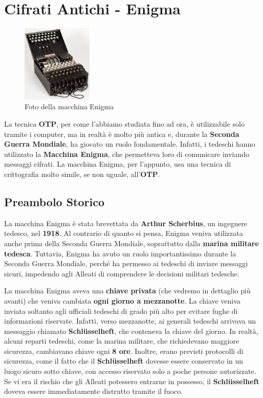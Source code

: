 \documentclass{rapport}
\begin{document}
\newpage

\section{Cifrati Antichi - Enigma}

\begin{figure}
    \centering
    \includegraphics[width=0.30\textwidth]{logos/enigma.jpg}
    \caption*{Foto della macchina Enigma}
\end{figure}

La tecnica \textbf{OTP}, per come l'abbiamo studiata fino ad ora, è utilizzabile solo tramite i computer, ma in realtà è molto più antica e, durante la \textbf{Seconda Guerra Mondiale}, ha giocato un ruolo fondamentale. Infatti, i tedeschi hanno utilizzato la \textbf{Macchina Enigma}, che permetteva loro di comunicare inviando messaggi cifrati. La macchina Enigma, per l'appunto, usa una tecnica di crittografia molto simile, se non uguale, all'\textbf{OTP}.


\subsection{Preambolo Storico}

La macchina Enigma è stata brevettata da \textbf{Arthur Scherbius}, un ingegnere tedesco, nel \textbf{1918}. Al contrario di quanto si pensa, Enigma veniva utilizzata anche prima della Seconda Guerra Mondiale, soprattutto dalla \textbf{marina militare tedesca}. Tuttavia, Enigma ha avuto un ruolo importantissimo durante la Seconda Guerra Mondiale, perché ha permesso ai tedeschi di inviare messaggi sicuri, impedendo agli Alleati di comprendere le decisioni militari tedesche. 

La macchina Enigma aveva una \textbf{chiave privata} (che vedremo in dettaglio più avanti) che veniva cambiata \textbf{ogni giorno a mezzanotte}. La chiave veniva inviata soltanto agli ufficiali tedeschi di grado più alto per evitare fughe di informazioni riservate. Infatti, verso mezzanotte, ai generali tedeschi arrivava un messaggio chiamato \textbf{Schlüsselheft}, che conteneva la chiave del giorno. In realtà, alcuni reparti tedeschi, come la marina militare, che richiedevano maggiore sicurezza, cambiavano chiave ogni \textbf{8 ore}. Inoltre, erano previsti protocolli di sicurezza, come il fatto che il \textbf{Schlüsselheft} dovesse essere conservato in un luogo sicuro sotto chiave, con accesso riservato solo a poche persone autorizzate. Se vi era il rischio che gli Alleati potessero entrarne in possesso, il \textbf{Schlüsselheft} doveva essere immediatamente distrutto tramite il fuoco.
\end{document}
